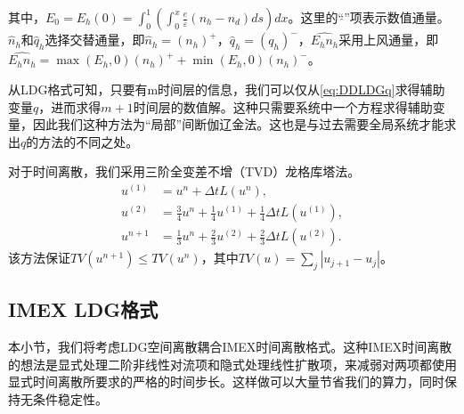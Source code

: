 其中，$E_{0}=E_h(0)=\int_{0}^{1}\left(\int_{0}^{x} \frac{e}{\varepsilon}\left(n_h-n_{d}\right) d s\right) d x$。这里的“$\hat{}$”项表示数值通量。$\hat{n}_{h}$和$\hat{q}_{h}$选择交替通量，即$\hat{n}_{h}=\left(n_h\right)^{+}$，$\hat{q}_{h}=\left(q_h\right)^{-}$，$\widehat{E_h n_h}$采用上风通量，即$\widehat{E_h n_h}=\max \left(E_h, 0\right)\left(n_h\right)^{+}+\min \left(E_h, 0\right)\left(n_h\right)^{-}$。

从LDG格式可知，只要有m时间层的信息，我们可以仅从\eqref{eq:DDLDGq}求得辅助变量$q$，进而求得$m+1$时间层的数值解。这种只需要系统中一个方程求得辅助变量，因此我们这种方法为“局部”间断伽辽金法。这也是与过去需要全局系统才能求出$q$的方法的不同之处。

对于时间离散，我们采用三阶全变差不增（TVD）龙格库塔法。
\begin{align}
	u^{(1)} & = u^n + \Delta t L(u^n),                                                \\
	u^{(2)} & = \frac{3}{4}u^n + \frac{1}{4}u^{(1)} + \frac{1}{4}\Delta t L(u^{(1)}), \\
	u^{n+1} & = \frac{1}{3}u^n + \frac{2}{3}u^{(2)} + \frac{2}{3}\Delta t L(u^{(2)}).
\end{align}
该方法保证$TV(u^{n+1})\leq TV(u^n)$，其中$TV(u) = \sum_j |u_{j+1}-u_j|$。
\subsection{IMEX LDG格式}
本小节，我们将考虑LDG空间离散耦合IMEX时间离散格式。这种IMEX时间离散的想法是显式处理二阶非线性对流项和隐式处理线性扩散项，来减弱对两项都使用显式时间离散所要求的严格的时间步长。这样做可以大量节省我们的算力，同时保持无条件稳定性。

